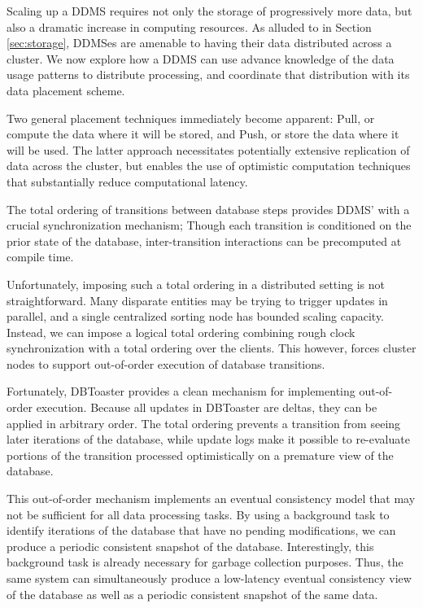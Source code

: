 Scaling up a DDMS requires not only the storage of progressively more data, but also a dramatic increase in computing resources.  As alluded to in Section \ref{sec:storage}, DDMSes are amenable to having their data distributed across a cluster.  We now explore how a DDMS can use advance knowledge of the data usage patterns to distribute processing, and coordinate that distribution with its data placement scheme.

Two general placement techniques immediately become apparent: Pull, or compute the data where it will be stored, and Push, or store the data where it will be used.  The latter approach necessitates potentially extensive replication of data across the cluster, but enables the use of optimistic computation techniques that substantially reduce computational latency.

The total ordering of transitions between database steps provides DDMS' with a crucial synchronization mechanism; Though each transition is conditioned on the prior state of the database, inter-transition interactions can be precomputed at compile time.  

Unfortunately, imposing such a total ordering in a distributed setting is not straightforward.  Many disparate entities may be trying to trigger updates in parallel, and a single centralized sorting node has bounded scaling capacity.  Instead, we can impose a logical total ordering combining rough clock synchronization with a total ordering over the clients.  This however, forces cluster nodes to support out-of-order execution of database transitions.

Fortunately, DBToaster provides a clean mechanism for implementing out-of-order execution.  Because all updates in DBToaster are deltas, they can be applied in arbitrary order.  The total ordering prevents a transition from seeing later iterations of the database, while update logs make it possible to re-evaluate portions of the transition processed optimistically on a premature view of the database.  

This out-of-order mechanism implements an eventual consistency model that may not be sufficient for all data processing tasks.  By using a background task to identify iterations of the database that have no pending modifications, we can produce a periodic consistent snapshot of the database.  Interestingly, this background task is already necessary for garbage collection purposes.  Thus, the same system can simultaneously produce a low-latency eventual consistency view of the database as well as a periodic consistent snapshot of the same data.